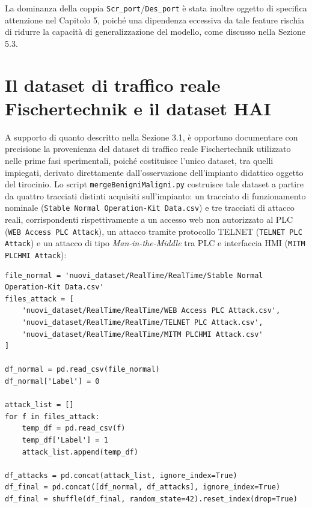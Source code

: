 \documentclass[12pt,a4paper]{report}
\begin{document}
La dominanza della coppia \texttt{Scr\_port}/\texttt{Des\_port} è stata inoltre oggetto di specifica attenzione nel Capitolo 5, poiché una dipendenza eccessiva da tale feature rischia di ridurre la capacità di generalizzazione del modello, come discusso nella Sezione 5.3.

\section{Il dataset di traffico reale Fischertechnik e il dataset HAI}

A supporto di quanto descritto nella Sezione 3.1, è opportuno documentare con precisione la provenienza del dataset di traffico reale Fischertechnik utilizzato nelle prime fasi sperimentali, poiché costituisce l'unico dataset, tra quelli impiegati, derivato direttamente dall'osservazione dell'impianto didattico oggetto del tirocinio. Lo script \texttt{mergeBenigniMaligni.py} costruisce tale dataset a partire da quattro tracciati distinti acquisiti sull'impianto: un tracciato di funzionamento nominale (\texttt{Stable Normal Operation-Kit Data.csv}) e tre tracciati di attacco reali, corrispondenti rispettivamente a un accesso web non autorizzato al PLC (\texttt{WEB Access PLC Attack}), un attacco tramite protocollo TELNET (\texttt{TELNET PLC Attack}) e un attacco di tipo \emph{Man-in-the-Middle} tra PLC e interfaccia HMI (\texttt{MITM PLCHMI Attack}):

\begin{lstlisting}[caption={Costruzione del dataset di traffico reale Fischertechnik (\texttt{mergeBenigniMaligni.py})}]
file_normal = 'nuovi_dataset/RealTime/RealTime/Stable Normal Operation-Kit Data.csv'
files_attack = [
    'nuovi_dataset/RealTime/RealTime/WEB Access PLC Attack.csv',
    'nuovi_dataset/RealTime/RealTime/TELNET PLC Attack.csv',
    'nuovi_dataset/RealTime/RealTime/MITM PLCHMI Attack.csv'
]

df_normal = pd.read_csv(file_normal)
df_normal['Label'] = 0

attack_list = []
for f in files_attack:
    temp_df = pd.read_csv(f)
    temp_df['Label'] = 1
    attack_list.append(temp_df)

df_attacks = pd.concat(attack_list, ignore_index=True)
df_final = pd.concat([df_normal, df_attacks], ignore_index=True)
df_final = shuffle(df_final, random_state=42).reset_index(drop=True)
\end{lstlisting}
\end{document}
